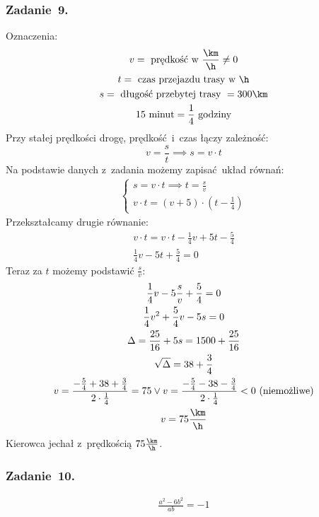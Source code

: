\subsubsection*{Zadanie~9.}
Oznaczenia:
\begin{gather*}
    v = \text{ prędkość w \(\frac{\km}{\h}\)} \neq 0\\
    t = \text{ czas przejazdu trasy w \(\h\)}\\
    s = \text{ długość przebytej trasy } = 300\km\\
    15\text{ minut} = \frac{1}{4}\text{ godziny}
\end{gather*}
Przy stałej prędkości drogę, prędkość i~czas łączy zależność:
\begin{equation*}
    v = \frac{s}{t} \implies s = v \cdot t
\end{equation*}
Na podstawie danych z~zadania możemy zapisać układ równań:
\begin{gather*}
    \begin{cases}
        s = v \cdot t \implies t = \frac{s}{v}\\
        v \cdot t = (v + 5) \cdot (t - \frac{1}{4})
    \end{cases}
\end{gather*}
Przekształcamy drugie równanie:
\begin{gather*}
    v \cdot t = v \cdot t - \frac{1}{4}v + 5t - \frac{5}{4}\\
    \frac{1}{4}v - 5t + \frac{5}{4} = 0
\end{gather*}
Teraz za \(t\) możemy podstawić \(\frac{s}{v}\):
\begin{gather*}
    \frac{1}{4}v - 5\frac{s}{v} + \frac{5}{4} = 0\\
    \frac{1}{4}v^2 + \frac{5}{4}v - 5s = 0\\
    \Delta = \frac{25}{16} + 5s = 1500 + \frac{25}{16}\\
    \sqrt{\Delta} = 38 + \frac{3}{4}\\
    v = \frac{-\frac{5}{4} + 38 + \frac{3}{4}}{2 \cdot \frac{1}{4}} = 75 \lor v = \frac{-\frac{5}{4} - 38 - \frac{3}{4}}{2 \cdot \frac{1}{4}} < 0 \text{ (niemożliwe)}\\
    v = 75\frac{\km}{\h}
\end{gather*}
Kierowca jechał z~prędkością \(75\frac{\km}{\h}\).
\subsubsection*{Zadanie~10.}
\begin{gather*}
    \frac{a^2 - 6b^2}{ab} = -1
\end{gather*}
